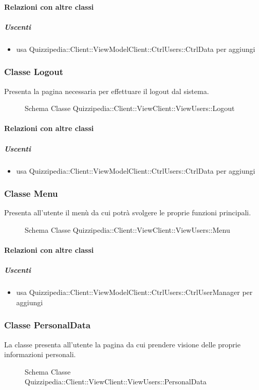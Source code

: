 \paragraph{Relazioni con altre classi}
\subparagraph{Uscenti}
\begin{itemize}
\item usa Quizzipedia::Client::ViewModelClient::CtrlUsers::CtrlData per aggiungi
\end{itemize}
\subsubsection{Classe Logout}
Presenta la pagina necessaria per effettuare il logout dal sistema.
\begin{figure}[H]
\centering
\noindent{}
\caption[Schema Classe Logout]{Schema Classe Quizzipedia::Client::ViewClient::ViewUsers::Logout}
\end{figure}
\paragraph{Relazioni con altre classi}
\subparagraph{Uscenti}
\begin{itemize}
\item usa Quizzipedia::Client::ViewModelClient::CtrlUsers::CtrlData per aggiungi
\end{itemize}
\subsubsection{Classe Menu}
Presenta all'utente il menù da cui potrà svolgere le proprie funzioni principali.
\begin{figure}[H]
\centering
\noindent{}
\caption[Schema Classe Menu]{Schema Classe Quizzipedia::Client::ViewClient::ViewUsers::Menu}
\end{figure}
\paragraph{Relazioni con altre classi}
\subparagraph{Uscenti}
\begin{itemize}
\item usa Quizzipedia::Client::ViewModelClient::CtrlUsers::CtrlUserManager per aggiungi
\end{itemize}
\subsubsection{Classe PersonalData}
La classe presenta all'utente la pagina da cui prendere visione delle proprie informazioni personali.
\begin{figure}[H]
\centering
\noindent{}
\caption[Schema Classe PersonalData]{Schema Classe Quizzipedia::Client::ViewClient::ViewUsers::PersonalData}
\end{figure}
